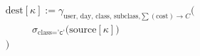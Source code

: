 \documentclass{article}
\newcommand{\source}[1]{\ensuremath{\text{source}\left[{#1}\right]}}
\newcommand{\dest}[1]{\ensuremath{\text{dest}\left[{#1}\right]}}
\newcommand{\ind}{\ensuremath{\phantom{= =}}}
\begin{document}
\begin{center}
\begin{preview}
	\hspace*{-2.75cm}\vbox{
		\begin{align*}
			&\dest{\kappa} := \gamma_{\text{user, day, class, subclass,} \sum(\text{cost}) \rightarrow C} \bigl( \\
			&\ind \sigma_{\text{class} = \texttt{'c'}}\bigl( \source{\kappa} \bigr) \nonumber \\
			&\bigr) \nonumber \\
		\end{align*}
	}\hspace*{-2.75cm}
\end{preview}
\end{center}
\end{document}
